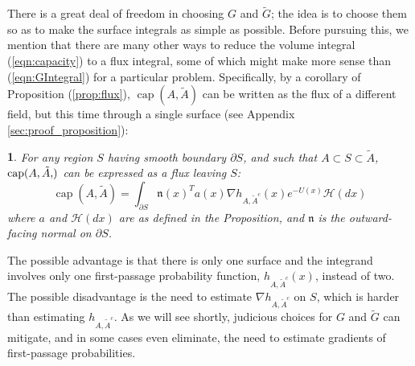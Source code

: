 \documentclass[nofootinbib,english, aip, jcp, priprint, graphicx,floatfix]{revtex4-1}
\theoremstyle{plain}
\theoremstyle{definition}
\theoremstyle{plain}
\newtheorem{cor}[thm]{\protect\corollaryname}
\newcommand{\normal}{{\mathfrak{n}}}
\newcommand{\capac}[2]{\ensuremath{\operatorname{cap}}(#1,#2)}
\newcommand{\hausdorffmeasure}{\mathscr{H}(dx)}
\providecommand{\corollaryname}{Corollary}
\newcommand{\tA}{{\tilde A}}
\begin{document}
There is a great deal of freedom in choosing $G$ and $\tilde G$; the idea is to choose them so as to make the surface integrals as simple as possible. Before pursuing this, we mention that there are many other ways to reduce the volume integral (\ref{eqn:capacity}) to a flux integral, some of which might make more sense than (\ref{eqn:GIntegral}) for a particular problem. Specifically, by a corollary of 
Proposition (\ref{prop:flux}), $\capac{A}{\tilde A}$ can be written as the flux of a different field, but this time through a single surface (see Appendix \ref{sec:proof_proposition}):
\begin{cor}
\label{cor:flux}
For any region $S$ having smooth boundary $\partial S$, and such that $A\subset S \subset \tilde A$, $\capac{A,\tA}$ can be expressed as a flux leaving $S$:
\begin{equation}
\ensuremath{\operatorname{cap}} (A, \tilde{A}) = \int_{\partial S}   \normal(x)^T a (x) \nabla h_{A, \tilde{A}^c} (x)e^{- U (x)} \hausdorffmeasure
\end{equation}
where $a$ and $\hausdorffmeasure$ are as defined in the Proposition, and  $\normal$ is the outward-facing normal on $\partial S$.
\end{cor}
\noindent
The possible advantage is that there is only one surface and the integrand involves only one first-passage probability function, $h_{A, \tilde{A}^c} (x)$, instead of two. The possible disadvantage is the need to estimate $\nabla h_{A, \tilde{A}^c}$ on $S$, which is harder than estimating $h_{A, \tilde{A}^c}$. As we will see shortly, judicious choices for $G$ and $\tilde G$ can mitigate, and in some cases even eliminate, the need to estimate gradients of first-passage probabilities.
\end{document}
